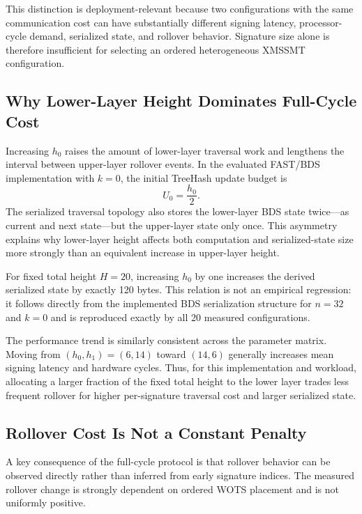 \documentclass[pdflatex,sn-mathphys-num]{sn-jnl}
\begin{document}
This distinction is deployment-relevant because two configurations with
the same communication cost can have substantially different signing
latency, processor-cycle demand, serialized state, and rollover
behavior. Signature size alone is therefore insufficient for selecting
an ordered heterogeneous XMSSMT configuration.

\subsection{Why Lower-Layer Height Dominates Full-Cycle Cost}
\label{sec:discussion_height}

Increasing $h_0$ raises the amount of lower-layer traversal work and
lengthens the interval between upper-layer rollover events. In the
evaluated FAST/BDS implementation with $k=0$, the initial TreeHash
update budget is
\[
U_0=\frac{h_0}{2}.
\]
The serialized traversal topology also stores the lower-layer BDS state
twice---as current and next state---but the upper-layer state only once.
This asymmetry explains why lower-layer height affects both computation
and serialized-state size more strongly than an equivalent increase in
upper-layer height.

For fixed total height $H=20$, increasing $h_0$ by one increases the
derived serialized state by exactly 120 bytes. This relation is not an
empirical regression: it follows directly from the implemented BDS
serialization structure for $n=32$ and $k=0$ and is reproduced exactly
by all 20 measured configurations.

The performance trend is similarly consistent across the parameter
matrix. Moving from $(h_0,h_1)=(6,14)$ toward $(14,6)$ generally
increases mean signing latency and hardware cycles. Thus, for this
implementation and workload, allocating a larger fraction of the fixed
total height to the lower layer trades less frequent rollover for higher
per-signature traversal cost and larger serialized state.

\subsection{Rollover Cost Is Not a Constant Penalty}
\label{sec:discussion_rollover}

A key consequence of the full-cycle protocol is that rollover behavior
can be observed directly rather than inferred from early signature
indices. The measured rollover change is strongly dependent on ordered
WOTS placement and is not uniformly positive.
\end{document}
